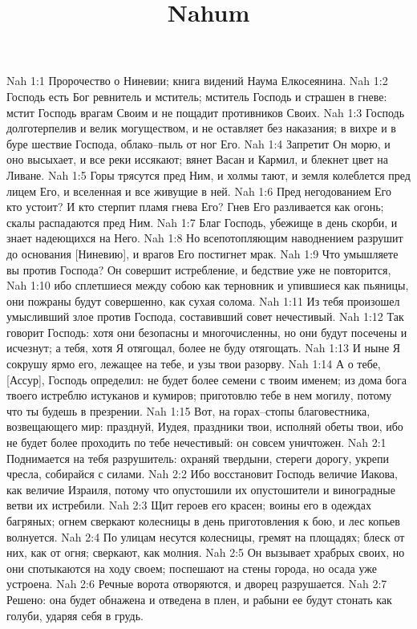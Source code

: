 

\title{Nahum}

Nah 1:1  Пророчество о Ниневии; книга видений Наума Елкосеянина.
Nah 1:2  Господь есть Бог ревнитель и мститель; мститель Господь и страшен в гневе: мстит Господь врагам Своим и не пощадит противников Своих.
Nah 1:3  Господь долготерпелив и велик могуществом, и не оставляет без наказания; в вихре и в буре шествие Господа, облако--пыль от ног Его.
Nah 1:4  Запретит Он морю, и оно высыхает, и все реки иссякают; вянет Васан и Кармил, и блекнет цвет на Ливане.
Nah 1:5  Горы трясутся пред Ним, и холмы тают, и земля колеблется пред лицем Его, и вселенная и все живущие в ней.
Nah 1:6  Пред негодованием Его кто устоит? И кто стерпит пламя гнева Его? Гнев Его разливается как огонь; скалы распадаются пред Ним.
Nah 1:7  Благ Господь, убежище в день скорби, и знает надеющихся на Него.
Nah 1:8  Но всепотопляющим наводнением разрушит до основания [Ниневию], и врагов Его постигнет мрак.
Nah 1:9  Что умышляете вы против Господа? Он совершит истребление, и бедствие уже не повторится,
Nah 1:10  ибо сплетшиеся между собою как терновник и упившиеся как пьяницы, они пожраны будут совершенно, как сухая солома.
Nah 1:11  Из тебя произошел умысливший злое против Господа, составивший совет нечестивый.
Nah 1:12  Так говорит Господь: хотя они безопасны и многочисленны, но они будут посечены и исчезнут; а тебя, хотя Я отягощал, более не буду отягощать.
Nah 1:13  И ныне Я сокрушу ярмо его, лежащее на тебе, и узы твои разорву.
Nah 1:14  А о тебе, [Ассур], Господь определил: не будет более семени с твоим именем; из дома бога твоего истреблю истуканов и кумиров; приготовлю тебе в нем могилу, потому что ты будешь в презрении.
Nah 1:15  Вот, на горах--стопы благовестника, возвещающего мир: празднуй, Иудея, праздники твои, исполняй обеты твои, ибо не будет более проходить по тебе нечестивый: он совсем уничтожен.
Nah 2:1  Поднимается на тебя разрушитель: охраняй твердыни, стереги дорогу, укрепи чресла, собирайся с силами.
Nah 2:2  Ибо восстановит Господь величие Иакова, как величие Израиля, потому что опустошили их опустошители и виноградные ветви их истребили.
Nah 2:3  Щит героев его красен; воины его в одеждах багряных; огнем сверкают колесницы в день приготовления к бою, и лес копьев волнуется.
Nah 2:4  По улицам несутся колесницы, гремят на площадях; блеск от них, как от огня; сверкают, как молния.
Nah 2:5  Он вызывает храбрых своих, но они спотыкаются на ходу своем; поспешают на стены города, но осада уже устроена.
Nah 2:6  Речные ворота отворяются, и дворец разрушается.
Nah 2:7  Решено: она будет обнажена и отведена в плен, и рабыни ее будут стонать как голуби, ударяя себя в грудь.
